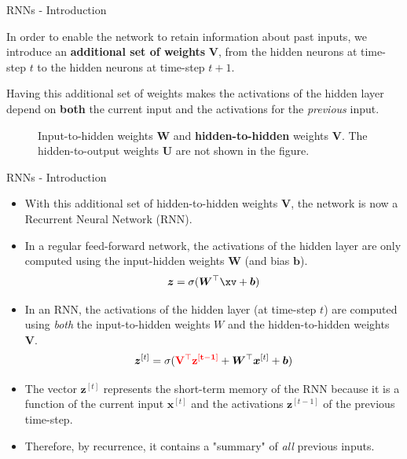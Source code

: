 \begin{frame} {RNNs - Introduction}
  \begin{itemize}
    \item \small{In order to enable the network to retain information about past inputs, we introduce an \textbf{additional set of weights} $\bm{V}$, from the hidden neurons at time-step $t$ to the hidden neurons at time-step $t+1$.
    \item Having this additional set of weights makes the activations of the hidden layer depend on \textbf{both} the current input and the activations for the \textit{previous} input.}
  \end{itemize}
  \begin{figure}
      \centering
      \caption{\footnotesize Input-to-hidden weights $\bm{W}$ and \textbf{hidden-to-hidden} weights $\bm{V}$. The hidden-to-output weights $\bm{U}$ are not shown in the figure.}
  \end{figure}
\end{frame}

\begin{frame} {RNNs - Introduction}
  \begin{itemize}
    \item With this additional set of hidden-to-hidden weights $\bm{V}$, the network is now a Recurrent Neural Network (RNN).
    \item In a regular feed-forward network, the activations of the hidden layer are only computed using the input-hidden weights $\bm{W}$ (and bias $\bm{b}$).
    $$\bm{z}= \sigma(\bm{W}^\top \xv + \bm{b})$$
    \item In an RNN, the activations of the hidden layer (at time-step $t$) are computed using \textit{both} the input-to-hidden weights $W$ and the hidden-to-hidden weights $\bm{V}$.
    $$\bm{z}^{[t]} = \sigma(\mathbf{\textcolor{red}{\bm{V}^\top\bm{z}^{[t-1]}}} + \bm{W}^\top \bm{x}^{[t]} + \bm{b})$$
    \item The vector $\bm{z}^{[t]}$ represents the short-term memory of the RNN because it is a function of the current input $\bm{x}^{[t]}$ and the activations $\bm{z}^{[t-1]}$ of the previous time-step.
    \item Therefore, by recurrence, it contains a "summary" of \textit{all} previous inputs. 
  \end{itemize}
\end{frame}




